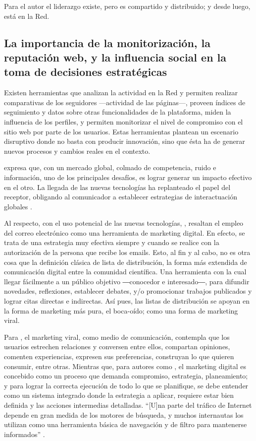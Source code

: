 \documentclass{textolivre}
\begin{document}
Para el autor \cite{castells_prefacio:_2011} el liderazgo existe, pero es compartido y distribuido; y desde luego, está en la Red.

\subsection{La importancia de la monitorización, la reputación web, y la influencia social en la toma de decisiones estratégicas}\label{sec-importancia}
Existen herramientas que analizan la actividad en la Red y permiten realizar comparativas de los seguidores —actividad de las páginas—, proveen índices de seguimiento y datos sobre otras funcionalidades de la plataforma, miden la influencia de los perfiles, y permiten monitorizar el nivel de compromiso con el sitio web por parte de los usuarios. Estas herramientas plantean un escenario disruptivo donde no basta con producir innovación, sino que ésta ha de generar nuevos procesos y cambios reales en el contexto.

\textcite{ferrer_gonzalez_comportamiento_2018} expresa que, con un mercado global, colmado de competencia, ruido e información, uno de los principales desafíos, es lograr generar un impacto efectivo en el otro. La llegada de las nuevas tecnologías ha replanteado el papel del receptor, obligando al comunicador a establecer estrategias de interactuación globales \cite{barrios_rubio_comunicador_2014}. 

Al respecto, con el uso potencial de las nuevas tecnologías, \textcite{salazar-corrales_marketing_2017}, resaltan el empleo del correo electrónico como una herramienta de marketing digital. En efecto, se trata de una estrategia muy efectiva siempre y cuando se realice con la autorización de la persona que recibe los emails. Esto, al fin y al cabo, no es otra cosa que la definición clásica de lista de distribución, la forma más extendida de comunicación digital entre la comunidad científica. Una herramienta con la cual llegar fácilmente a un público objetivo ―conocedor e interesado―, para difundir novedades, reflexiones, establecer debates, y/o promocionar trabajos publicados y lograr citas directas e indirectas. Así pues, las listas de distribución se apoyan en la forma de marketing más pura, el boca-oído; como una forma de marketing viral.

Para \textcite{viteri_luque_importancia_2018}, el marketing viral, como medio de comunicación, contempla que los usuarios estrechen relaciones y conversen entre ellos, compartan opiniones, comenten experiencias, expresen sus preferencias, construyan lo que quieren consumir, entre otras. Mientras que, para autores como \textcite{salazar-corrales_marketing_2017},
el marketing digital es concebido como un proceso que demanda compromiso, estrategia, planeamiento; y para lograr la correcta ejecución de todo lo que se planifique, se debe entender como un sistema integrado donde la estrategia a aplicar, requiere estar bien definida y las acciones intermedias detalladas. “[U]na parte del tráfico de Internet depende en gran medida de los motores de búsqueda, y muchos internautas los utilizan como una herramienta básica de navegación y de filtro para mantenerse informados” \cite[p. 930]{iglesias-garcia_cibermedios_2016}.
\end{document}

